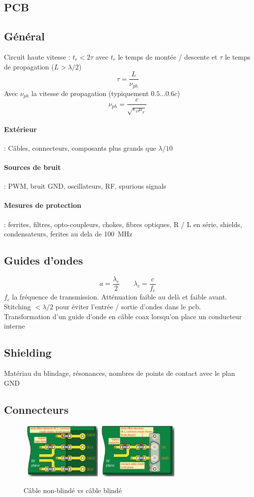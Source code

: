 \documentclass[resume]{subfiles}
\begin{document}
\begin{multicols}{3}
\section{PCB}
\subsection{Général}
Circuit haute vitesse : $t_r < 2\tau$ avec $t_r$ le temps de montée / descente et $\tau$ le temps de propagation ($L > \lambda/2$)
$$\tau=\frac{L}{\nu_{ph}}$$
Avec $\nu_{ph}$ la vitesse de propagation (typiquement $0.5$...$0.6c$)
$$\nu_{ph}=\frac{c}{\sqrt{\epsilon_r\mu_r}}$$
\paragraph{Extérieur} : Câbles, connecteurs, composants plus grands que $\lambda/10$
\paragraph{Sources de bruit} : PWM, bruit GND, oscillateurs, RF, spurious signals
\paragraph{Mesures de protection} : ferrites, filtres, opto-coupleurs, chokes, fibres optiques, R / L en série, shields, condensateurs, ferites au dela de \SI{100}{\mega\hertz}
\subsection{Guides d'ondes}
$$a=\frac{\lambda_c}{2}\qquad \lambda_c=\frac{c}{f_c}$$
$f_c$ la fréquence de transmission. Atténuation faible au delà et faible avant. Stitching $<\lambda/2$ pour éviter l'entrée / sortie d'ondes dans le pcb.\\
Transformation d'un guide d'onde en câble coax lorsqu'on place un conducteur interne
\subsection{Shielding}
Matériau du blindage, résonances, nombres de points de contact avec le plan GND
\subsection{Connecteurs}
\begin{figure}[H]
\centering
\includegraphics[width=4.00cm]{img_0.png}
\includegraphics[width=4.00cm]{img_1.png}
\caption{Câble non-blindé vs câble blindé}
\end{figure}

\end{multicols}
\end{document}
